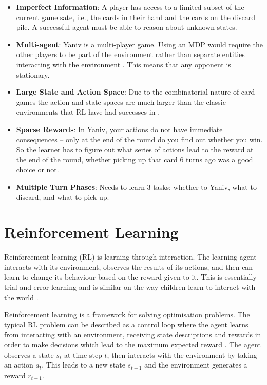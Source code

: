 \documentclass[../main.tex]{subfiles}
\begin{document}
\begin{itemize}[nosep]
    \item \textbf{Imperfect Information}: A player has access to a limited subset of the current game sate, i.e., the cards in their hand and the cards on the discard pile. A successful agent must be able to reason about unknown states. 
    \item \textbf{Multi-agent}: Yaniv is a multi-player game. Using an MDP would require the other players to be part of the environment rather than separate entities interacting with the environment \cite{littman_markov_1994}. This means that any opponent is stationary. 
    \item \textbf{Large State and Action Space}: Due to the combinatorial nature of card games the action and state spaces are much larger than the classic environments that RL have had successes in \cite{jiang_deltadou_2019}.
    \item \textbf{Sparse Rewards}: In Yaniv, your actions do not have immediate consequences -- only at the end of the round do you find out whether you win. So the learner has to figure out what series of actions lead to the reward at the end of the round, whether picking up that card 6 turns ago was a good choice or not. 
    \item \textbf{Multiple Turn Phases}: Needs to learn 3 tasks: whether to Yaniv, what to discard, and what to pick up.
\end{itemize}

\section{Reinforcement Learning}
Reinforcement learning (RL) is learning through interaction. The learning agent interacts with its environment, observes the results of its actions, and then can learn to change its behaviour based on the reward given to it. This is essentially trial-and-error learning and is similar on the way children learn to interact with the world \cite{sutton_reinforcement_2018}.

Reinforcement learning is a framework for solving optimisation problems. The typical RL problem can be described as a control loop where the agent learns from interacting with an environment, receiving state descriptions and rewards in order to make decisions which lead to the maximum expected reward \cite{mnih_human-level_2015}. The agent observes a state $s_t$ at time step $t$, then interacts with the environment by taking an action $a_t$. This leads to a new state $s_{t+1}$ and the environment generates a reward $r_{t+1}$. 
\end{document}
